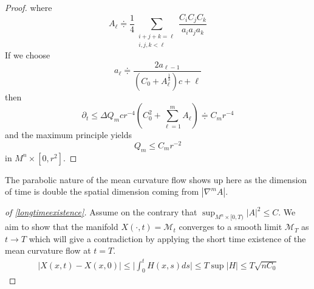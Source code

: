 \begin{proof}
where
$$
A_{\ell} \doteqdot \frac{1}{4} \sum_{\substack{i+j+k=\ell \\ i, j, k<\ell}} \frac{C_i C_j C_k}{a_i a_j a_k}
$$
If we choose
$$
a_{\ell} \doteqdot \frac{2 a_{\ell-1}}{\left(C_0+A_{\ell}^{\frac{1}{3}}\right) c+\ell}
$$
then
$$
\partial_t \leq \Delta Q_m  c r^{-4}\left(C_0^2+\sum_{\ell=1}^m A_{\ell}\right) \doteqdot C_m r^{-4}
$$
and the maximum principle yields
$$
Q_m \leq C_m r^{-2}
$$
in $M^n \times\left[0, r^2\right]$.

\end{proof}

\begin{remark}
    The parabolic nature of the mean curvature flow shows up here as the dimension of time is double the spatial dimension coming from $ |\nabla^{m}A| $.
\end{remark}
\begin{proof}[ of \cref{longtimeexistence}]
    Assume on the contrary that $ \sup_{M^{n} \times [0, T)}|A|^{2} \le C $. We aim to show that the manifold $X(\cdot, t)= \mathcal{M}_{t} $ converges to a smooth limit $ \mathcal{M}_{T} $ as $ t \to T $ which will give a contradiction by applying the short time existence of the mean curvature flow at $ t  = T $. \begin{align*}
        |X(x,t)-X(x,0)| \le  \bigg|\int_{0}^{t} H(x,s) ds \bigg| \le T \sup |H| \le T \sqrt{nC_{0}}
    \end{align*}

\end{proof}

